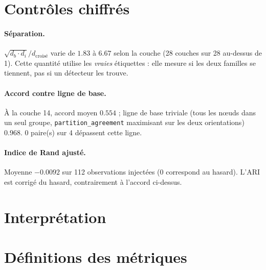 \documentclass[11pt,a4paper]{article}
\begin{document}
\section{Contrôles chiffrés}


\paragraph{Séparation.} $\sqrt{d_b \cdot d_i} / d_{\text{croisé}}$ varie
de $1.83$ à $6.67$ selon la couche
(28 couches sur 28 au-dessus de 1).
Cette quantité utilise les \emph{vraies} étiquettes : elle mesure si les deux
familles se tiennent, pas si un détecteur les trouve.



\paragraph{Accord contre ligne de base.} À la couche 14, accord moyen
$0.554$ ; ligne de base triviale (tous les n\oe uds dans
un seul groupe, \texttt{partition\_agreement} maximisant sur les deux
orientations) $0.968$.
0 paire(s) sur 4 dépassent cette ligne.



\paragraph{Indice de Rand ajusté.} Moyenne $-0.0092$ sur
112 observations injectées (0 correspond au hasard). L'ARI est corrigé
du hasard, contrairement à l'accord ci-dessus.


\section{Interprétation}



\section{Définitions des métriques}
\end{document}
